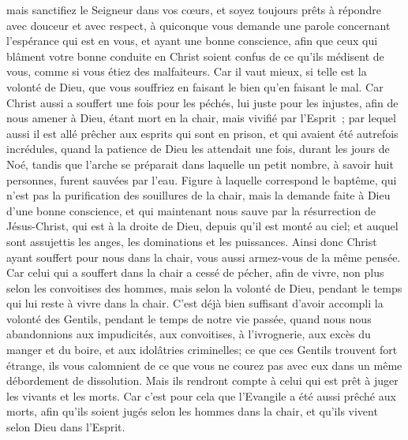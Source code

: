 \begin{multicols}{2}
mais sanctifiez le Seigneur dans vos cœurs, et soyez toujours prêts à répondre avec douceur et avec respect, à quiconque vous demande une parole concernant l'espérance qui est en vous,
et ayant une bonne conscience, afin que ceux qui blâment votre bonne conduite en Christ soient confus de ce qu'ils médisent de vous, comme si vous étiez des malfaiteurs.
Car il vaut mieux, si telle est la volonté de Dieu, que vous souffriez en faisant le bien qu'en faisant le mal.
Car Christ aussi a souffert une fois pour les péchés, lui juste pour les injustes, afin de nous amener à Dieu, étant mort en la chair, mais vivifié par l'Esprit~;
par lequel aussi il est allé prêcher aux esprits qui sont en prison,
et qui avaient été autrefois incrédules, quand la patience de Dieu les attendait une fois, durant les jours de Noé, tandis que l'arche se préparait dans laquelle un petit nombre, à savoir huit personnes, furent sauvées par l'eau.
Figure à laquelle correspond le baptême, qui n'est pas la purification des souillures de la chair, mais la demande faite à Dieu d'une bonne conscience, et qui maintenant nous sauve par la résurrection de Jésus-Christ,
qui est à la droite de Dieu, depuis qu'il est monté au ciel; et auquel sont assujettis les anges, les dominations et les puissances.
\VerseOne{}Ainsi donc Christ ayant souffert pour nous dans la chair, vous aussi armez-vous de la même pensée. Car celui qui a souffert dans la chair a cessé de pécher,
afin de vivre, non plus selon les convoitises des hommes, mais selon la volonté de Dieu, pendant le temps qui lui reste à vivre dans la chair.
C'est déjà bien suffisant d'avoir accompli la volonté des Gentils, pendant le temps de notre vie passée, quand nous nous abandonnions aux impudicités, aux convoitises, à l'ivrognerie, aux excès du manger et du boire, et aux idolâtries criminelles;
ce que ces Gentils trouvent fort étrange, ils vous calomnient de ce que vous ne courez pas avec eux dans un même débordement de dissolution.
Mais ils rendront compte à celui qui est prêt à juger les vivants et les morts.
Car c'est pour cela que l'Evangile a été aussi prêché aux morts, afin qu'ils soient jugés selon les hommes dans la chair, et qu'ils vivent selon Dieu dans l'Esprit.

\end{multicols}
